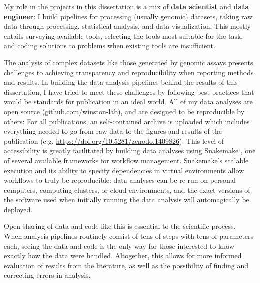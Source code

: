 My role in the projects in this dissertation is a mix of \href{https://blog.insightdatascience.com/data-science-vs-data-engineering-62da7678adaa}{\textbf{data scientist}} and \href{https://blog.insightdatascience.com/data-science-vs-data-engineering-62da7678adaa}{\textbf{data engineer}}: I build pipelines for processing (usually genomic) datasets, taking raw data through processing, statistical analysis, and data visualization.
This mostly entails surveying available tools, selecting the tools most suitable for the task, and coding solutions to problems when existing tools are insufficient.

The analysis of complex datasets like those generated by genomic assays presents challenges to achieving transparency and reproducibility when reporting methods and results.
In building the data analysis pipelines behind the results of this dissertation, I have tried to meet these challenges by following best practices that would be standards for publication in an ideal world.
All of my data analyses are open source (\href{https://github.com/winston-lab}{github.com/winston-lab}), and are designed to be reproducible by others: For all publications, an self-contained archive is uploaded which includes everything needed to go from raw data to the figures and results of the publication (e.g. \url{https://doi.org/10.5281/zenodo.1409826}).
This level of accessibility is greatly facilitated by building data analyses using Snakemake \citep{koster2012}, one of several available frameworks for workflow management.
Snakemake's scalable execution and its ability to specify dependencies in virtual environments allow workflows to truly be reproducible: data analyses can be re-run on personal computers, computing clusters, or cloud environments, and the exact versions of the software used when initially running the data analysis will automagically be deployed.

Open sharing of data and code like this is essential to the scientific process.
When analysis pipelines routinely consist of tens of steps with tens of parameters each, seeing the data and code is the only way for those interested to know exactly how the data were handled.
Altogether, this allows for more informed evaluation of results from the literature, as well as the possibility of finding and correcting errors in analysis.

\clearpage

\begingroup
    \singlespacing
    
\endgroup

